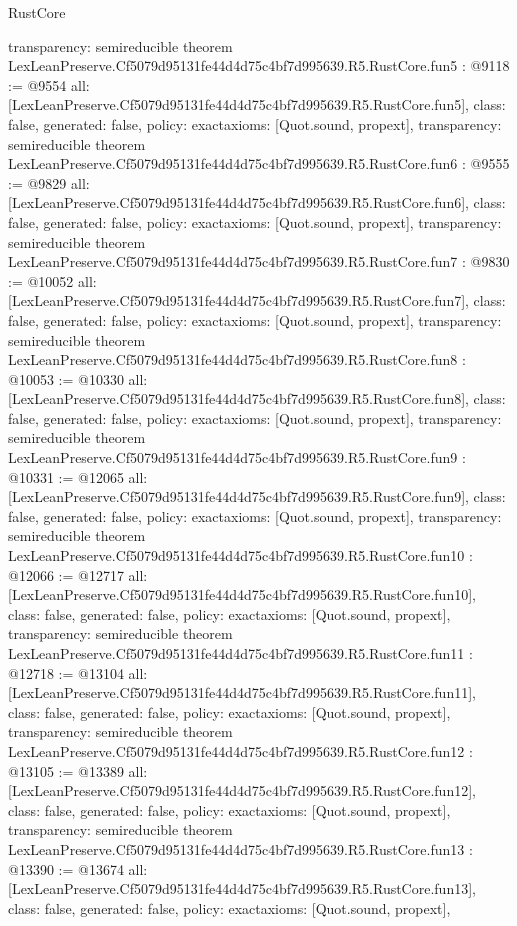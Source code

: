 \begin{lexlean}{RustCore}
\begin{coremodule}
{  transparency: semireducible
}
theorem LexLeanPreserve.Cf5079d95131fe44d4d75c4bf7d995639.R5.RustCore.fun5 : @9118 := @9554 {
  all: [LexLeanPreserve.Cf5079d95131fe44d4d75c4bf7d995639.R5.RustCore.fun5],
  class: false,
  generated: false,
  policy: exact{axioms: [Quot.sound, propext]},
  transparency: semireducible
}
theorem LexLeanPreserve.Cf5079d95131fe44d4d75c4bf7d995639.R5.RustCore.fun6 : @9555 := @9829 {
  all: [LexLeanPreserve.Cf5079d95131fe44d4d75c4bf7d995639.R5.RustCore.fun6],
  class: false,
  generated: false,
  policy: exact{axioms: [Quot.sound, propext]},
  transparency: semireducible
}
theorem LexLeanPreserve.Cf5079d95131fe44d4d75c4bf7d995639.R5.RustCore.fun7 : @9830 := @10052 {
  all: [LexLeanPreserve.Cf5079d95131fe44d4d75c4bf7d995639.R5.RustCore.fun7],
  class: false,
  generated: false,
  policy: exact{axioms: [Quot.sound, propext]},
  transparency: semireducible
}
theorem LexLeanPreserve.Cf5079d95131fe44d4d75c4bf7d995639.R5.RustCore.fun8 : @10053 := @10330 {
  all: [LexLeanPreserve.Cf5079d95131fe44d4d75c4bf7d995639.R5.RustCore.fun8],
  class: false,
  generated: false,
  policy: exact{axioms: [Quot.sound, propext]},
  transparency: semireducible
}
theorem LexLeanPreserve.Cf5079d95131fe44d4d75c4bf7d995639.R5.RustCore.fun9 : @10331 := @12065 {
  all: [LexLeanPreserve.Cf5079d95131fe44d4d75c4bf7d995639.R5.RustCore.fun9],
  class: false,
  generated: false,
  policy: exact{axioms: [Quot.sound, propext]},
  transparency: semireducible
}
theorem LexLeanPreserve.Cf5079d95131fe44d4d75c4bf7d995639.R5.RustCore.fun10 : @12066 := @12717 {
  all: [LexLeanPreserve.Cf5079d95131fe44d4d75c4bf7d995639.R5.RustCore.fun10],
  class: false,
  generated: false,
  policy: exact{axioms: [Quot.sound, propext]},
  transparency: semireducible
}
theorem LexLeanPreserve.Cf5079d95131fe44d4d75c4bf7d995639.R5.RustCore.fun11 : @12718 := @13104 {
  all: [LexLeanPreserve.Cf5079d95131fe44d4d75c4bf7d995639.R5.RustCore.fun11],
  class: false,
  generated: false,
  policy: exact{axioms: [Quot.sound, propext]},
  transparency: semireducible
}
theorem LexLeanPreserve.Cf5079d95131fe44d4d75c4bf7d995639.R5.RustCore.fun12 : @13105 := @13389 {
  all: [LexLeanPreserve.Cf5079d95131fe44d4d75c4bf7d995639.R5.RustCore.fun12],
  class: false,
  generated: false,
  policy: exact{axioms: [Quot.sound, propext]},
  transparency: semireducible
}
theorem LexLeanPreserve.Cf5079d95131fe44d4d75c4bf7d995639.R5.RustCore.fun13 : @13390 := @13674 {
  all: [LexLeanPreserve.Cf5079d95131fe44d4d75c4bf7d995639.R5.RustCore.fun13],
  class: false,
  generated: false,
  policy: exact{axioms: [Quot.sound, propext]},
}
\end{coremodule}
\end{lexlean}
